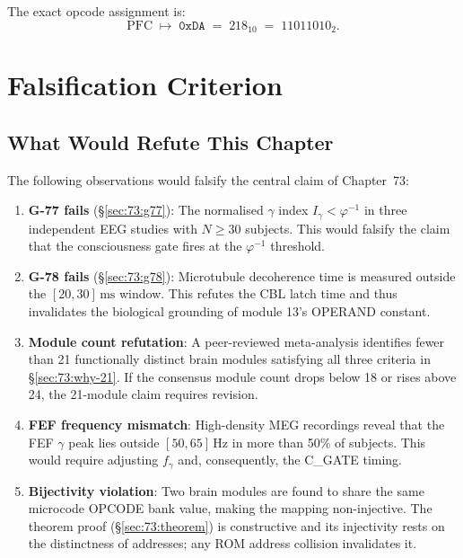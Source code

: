 The exact opcode assignment is:
\[
  \text{PFC} \;\mapsto\; \mathtt{0xDA}
  \;=\; 218_{10}
  \;=\; 11011010_{2}.
\]

\section{Falsification Criterion}
\label{sec:73:falsify}

\subsection{What Would Refute This Chapter}
\label{sec:73:refutation}

The following observations would falsify the central claim of
Chapter~73:

\begin{enumerate}
  \item \textbf{G-77 fails} (§\ref{sec:73:g77}):
    The normalised $\gamma$ index $I_{\gamma} < \varphi^{-1}$ in
    three independent EEG studies with $N \geq 30$ subjects.
    This would falsify the claim that the consciousness gate
    fires at the $\varphi^{-1}$ threshold.

  \item \textbf{G-78 fails} (§\ref{sec:73:g78}):
    Microtubule decoherence time is measured outside the
    $[20, 30]\,\mathrm{ms}$ window.
    This refutes the CBL latch time and thus invalidates the
    biological grounding of module 13's OPERAND constant.

  \item \textbf{Module count refutation}: A peer-reviewed
    meta-analysis identifies fewer than 21 functionally distinct
    brain modules satisfying all three criteria in
    §\ref{sec:73:why-21}.
    If the consensus module count drops below 18 or rises above
    24, the 21-module claim requires revision.

  \item \textbf{FEF frequency mismatch}: High-density MEG
    recordings reveal that the FEF $\gamma$ peak lies outside
    $[50, 65]\,\mathrm{Hz}$ in more than 50\% of subjects.
    This would require adjusting $f_{\gamma}$ and, consequently,
    the C\_GATE timing.

  \item \textbf{Bijectivity violation}: Two brain modules are
    found to share the same microcode OPCODE bank value, making
    the mapping non-injective.
    The theorem proof (§\ref{sec:73:theorem}) is constructive
    and its injectivity rests on the distinctness of addresses;
    any ROM address collision invalidates it.
\end{enumerate}

